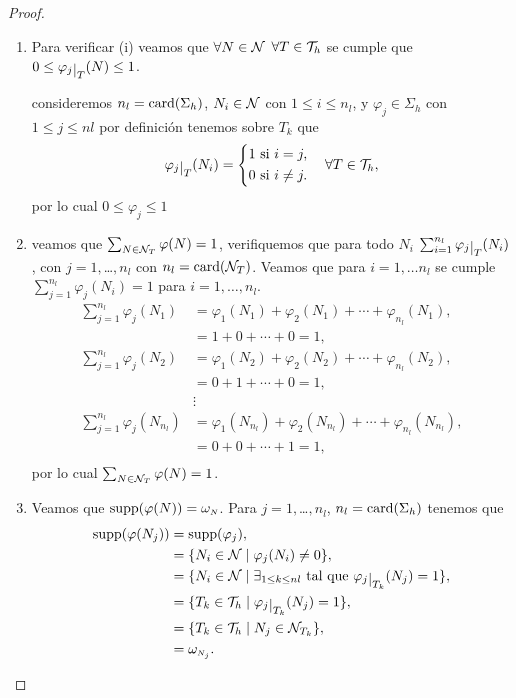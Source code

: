 \begin{proof}
\begin{enumerate}[{\rm (i)}]
	\item Para verificar {\rm (i)} veamos que $\forall N\in {\ensuremath{\mathcal{N}}}$ $\forall T\in {\ensuremath{\mathcal{T}}}_{h}$ se cumple que $0\leq \varphi_{j}\restr{T}(N)\leq 1$. 
	
	consideremos $n_{l}=\mathop{\rm card}(\Sigma_{h})$, $N_{i}\in {\ensuremath{\mathcal{N}}}$ con $1\leq i\leq n_{l}$,   y $\varphi_{j} \in \Sigma_{h}$ con $1\leq j \leq nl$ por definici\'on tenemos sobre $T_{k}$ que 
	\begin{equation}
	\varphi_{j}\restr{T}(N_{i})= \left\{ \begin{aligned}
	1  \text{ si } i=j,\\
	0 \text{ si } i\neq j .
	\end{aligned}
	\right. \quad \forall T\in \mct_{h},
	\end{equation}
por lo cual $0\leq \varphi_{j}\leq 1$
\item veamos que $\sum_{N\in{\ensuremath{\mathcal{N}}}_{T}} \varphi(N)=1$, verifiquemos que para todo $N_{i}$ $\sum_{i=1}^{n_{l}} \varphi_{j}\restr{T}(N_{i})$, con $j=1,$\ldots$,n_{l}$ con $n_{l}=\mathop{\rm card}({\mathcal{N}}_{T})$. 
Veamos que para $i=1,\ldots n_{l}$ se cumple $\sum_{j=1}^{n_{l}} \varphi_{j}(N_{i})=1$ para $i=1,\ldots,n_{l}$. 
\begin{equation}
\begin{split}
\sum_{j=1}^{n_{l}} \varphi_{j}(N_{1}) &= \varphi_{1}(N_{1}) + \varphi_{2}(N_{1})+\cdots + \varphi_{n_{l}}(N_{1}), \\
&=1+0+\cdots+0=1,\\
\sum_{j=1}^{n_{l}} \varphi_{j}(N_{2}) &= \varphi_{1}(N_{2}) + \varphi_{2}(N_{2})+\cdots + \varphi_{n_{l}}(N_{2}), \\
&=0+1+\cdots+0=1,\\
&\vdots\\
\sum_{j=1}^{n_{l}} \varphi_{j}(N_{n_{l}}) &= \varphi_{1}(N_{n_{l}}) + \varphi_{2}(N_{n_{l}})+\cdots + \varphi_{n_{l}}(N_{n_{l}}), \\
&=0+0+\cdots+1=1,\\
\end{split}
\end{equation}
por lo cual $\sum_{N\in{\ensuremath{\mathcal{N}}}_{T}}\varphi(N)=1$. 
\item Veamos que  $\operatorname{supp}(\varphi(N))=\omega_{\text{\tiny $N$}}$.
Para $j=1,$\ldots$,n_{l}$, $n_{l}=\mathop{\rm card}(\Sigma_{h})$ tenemos que 
\begin{equation}
\begin{split}
\supp(\varphi(N_{j}))&=\supp(\varphi_{j}),\\
&=\{ N_{i}\in \mcn \mid \varphi_{j}(N_{i})\neq 0  \},\\
&=\{ N_{i}\in \mcn \mid \exists_{1\leq k\leq nl}\text{ tal que } \varphi_{j}\restr{T_{k}}(N_{j})=1 \},\\
&=\{ T_{k}\in \mct_{h} \mid \varphi_{j}\restr{T_{k}}(N_{j})=1 \},\\
&=\{ T_{k} \in\mct_{h} \mid N_{j}\in \mcn_{T_{k}} \},\\
&=\omega_{\text{\tiny $N_{j}$}}.
\end{split}
\end{equation}
\end{enumerate}
\end{proof}
